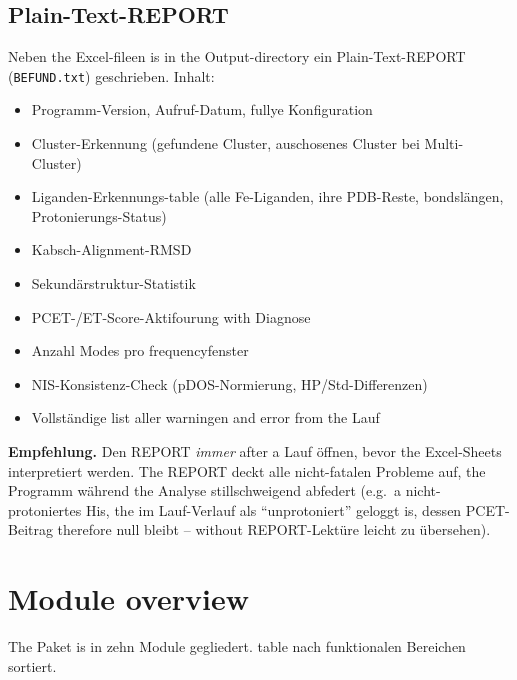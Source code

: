 \documentclass[11pt,a4paper,twoside]{article}
\theoremstyle{remark}
\begin{document}
\subsection{Plain-Text-REPORT}
\label{sec:befund}

Neben the Excel-fileen is in the Output-directory ein
Plain-Text-REPORT (\texttt{BEFUND.txt}) geschrieben. Inhalt:

\begin{itemize}
  \item Programm-Version, Aufruf-Datum, fullye Konfiguration
  \item Cluster-Erkennung (gefundene Cluster, auschosenes Cluster
        bei Multi-Cluster)
  \item Liganden-Erkennungs-table (alle Fe-Liganden, ihre PDB-Reste,
        bondsl\"angen, Protonierungs-Status)
  \item Kabsch-Alignment-RMSD
  \item Sekund\"arstruktur-Statistik
  \item PCET-/ET-Score-Aktifourung with Diagnose
  \item Anzahl Modes pro frequencyfenster
  \item NIS-Konsistenz-Check (pDOS-Normierung, HP/Std-Differenzen)
  \item Vollst\"andige list aller warningen and error from the Lauf
\end{itemize}

\begin{infobox}
\textbf{Empfehlung.} Den REPORT \emph{immer} after a Lauf \"offnen,
bevor the Excel-Sheets interpretiert werden. The REPORT deckt alle
nicht-fatalen Probleme auf, the Programm w\"ahrend the Analyse
stillschweigend abfedert (e.g.\ a nicht-protoniertes His, the im
Lauf-Verlauf als ``unprotoniert'' geloggt is, dessen PCET-Beitrag
therefore null bleibt -- without REPORT-Lekt\"ure leicht zu \"ubersehen).
\end{infobox}

\section{Module overview}
\label{sec:moduluebersicht}

The Paket is in zehn Module gegliedert. table nach
funktionalen Bereichen sortiert.
\end{document}
